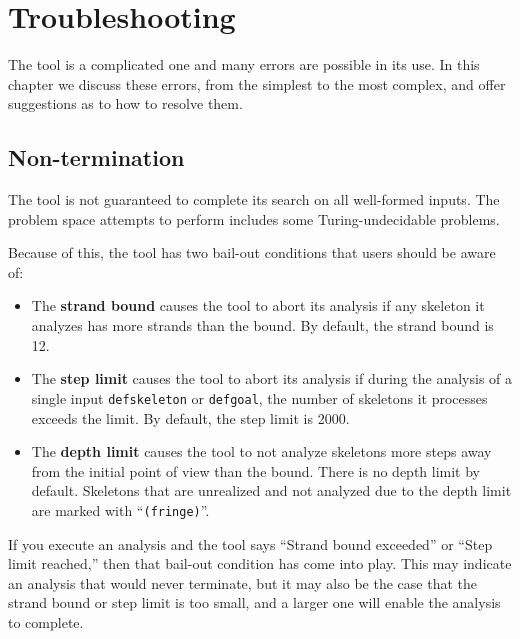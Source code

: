 \chapter {Troubleshooting}
\label{ch:troubleshooting}

The {\cpsa} tool is a complicated one and many errors are possible in
its use.  In this chapter we discuss these errors, from the simplest
to the most complex, and offer suggestions as to how to resolve them.

\section{Non-termination}
\label{sec:bounds}

The {\cpsa} tool is not guaranteed to complete its search on all
well-formed inputs.  The problem space {\cpsa} attempts to perform
includes some Turing-undecidable problems.

Because of this, the tool has two bail-out conditions that users should be
aware of:

\begin{itemize}

\item The {\bf strand bound} causes the tool to abort its analysis if any
skeleton it analyzes has more strands than the bound.  By default, the strand
bound is 12.

\item The {\bf step limit} causes the tool to abort its analysis if during
the analysis of a single input \texttt{defskeleton} or \texttt{defgoal}, the
number of skeletons it processes exceeds the limit.  By default, the step limit
is 2000.

\item The {\bf depth limit} causes the tool to not analyze skeletons
  more steps away from the initial point of view than the bound.
  There is no depth limit by default.  Skeletons that are unrealized and not
  analyzed due to the depth limit are marked with ``\texttt{(fringe)}''.

\end{itemize}

If you execute an analysis and the tool says ``Strand bound exceeded''
or ``Step limit reached,'' then that bail-out condition has come into play.
This may indicate an analysis that would never terminate, but it may also be
the case that the strand bound or step limit is too small, and a larger one will
enable the analysis to complete.

